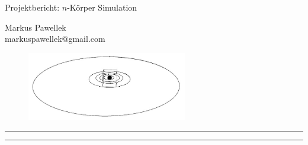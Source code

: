 \documentclass[11pt,fleqn,twoside,a4paper]{article}
\begin{document}
  \pagestyle{titlestyle}
  {\LARGE\bfseries \begin{center}{Projektbericht: $n$-Körper Simulation}\end{center}}
  \bigskip
  \begin{minipage}[t][][c]{0.45\textwidth}
  \end{minipage}
  \hfill
  \begin{minipage}[t][][c]{0.45\textwidth}
    \raggedright{Markus Pawellek \\ markuspawellek@gmail.com}
  \end{minipage}
  \bigskip
  \begin{figure}[H]
    \center
    \includegraphics[height=3.0cm]{pictures/cover_image.jpg}
  \end{figure}
  \bigskip
  \hrule
  \medskip
  \begin{abstract}
    \itshape
    
  \end{abstract}
  \medskip
  \hrule
  \bigskip
  \tableofcontents
  \bigskip
  \bigskip
  \bigskip
  \cleardoublepage
  \restoregeometry

  \pagestyle{mainstyle}
  \setcounter{page}{1}
  \thispagestyle{titleheadstyle}
  
    
    \cleardoublepage
    \thispagestyle{titleheadstyle}
    
    \cleardoublepage
    \thispagestyle{titleheadstyle}
    
    \cleardoublepage
    \thispagestyle{titleheadstyle}
    
    \cleardoublepage
    \thispagestyle{titleheadstyle}
    
    \cleardoublepage
    \thispagestyle{titleheadstyle}
    
    \cleardoublepage
    \thispagestyle{titleheadstyle}
    \appendix
    
\end{document}
